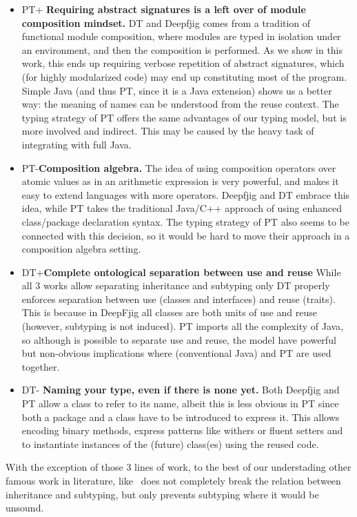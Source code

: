 \begin{itemize}
\item PT+
{\bf Requiring abstract signatures is a left over of module composition mindset.}
DT and Deepfjig comes from a tradition of functional module composition, where 
modules are typed in isolation under an environment, and then the composition is performed.
As we show in this work, this ends up requiring verbose repetition of abstract signatures,
which (for highly modularized code) may end up constituting most of the program.
Simple Java (and thus PT, since it is a Java extension) shows us a better way:
the meaning of names can be understood from the reuse context.
The typing strategy of PT offers the same advantages of our typing model, 
but is more involved and indirect. This may be caused by the
heavy task of integrating with full Java.
\item PT-{\bf Composition algebra.}
The idea of using composition operators over atomic values as in an arithmetic expression is very powerful,
and makes it easy to extend languages with more operators. Deepfjig and DT embrace this idea, while PT takes the traditional Java/C++ approach of using enhanced class/package declaration syntax.
The typing strategy of PT also seems to be connected with this
decision, so it would be hard to move their approach in a composition
algebra setting.
\item DT+{\bf Complete ontological separation between use and reuse}
While all 3 works allow separating inheritance and subtyping only DT properly enforces 
separation between use (classes and interfaces) and reuse (traits).
This is because in DeepFjig all classes are both units of use and reuse (however, subtyping is not induced).
PT imports all the complexity of Java, so although is possible to separate use and reuse, the model have powerful but non-obvious implications where (conventional Java) \Q@extends@ and PT are used together.
\item DT- {\bf Naming your type, even if there is none yet.}
Both Deepfjig and PT allow a class to refer to its name, albeit this is
less obvious in PT since both a package and a class have to be introduced to express it.
This allows encoding binary methods, express patterns like withers or fluent setters and to instantiate instances of the (future) class(es)  using the reused code.

\end{itemize}
With the exception of those 3 lines of work, to the best of our understading
other famous work in literature, like~\cite{odersky2008programming,nystrom2006j}
does not completely break the relation between inheritance and subtyping, but only prevents subtyping where 
it would be unsound.

